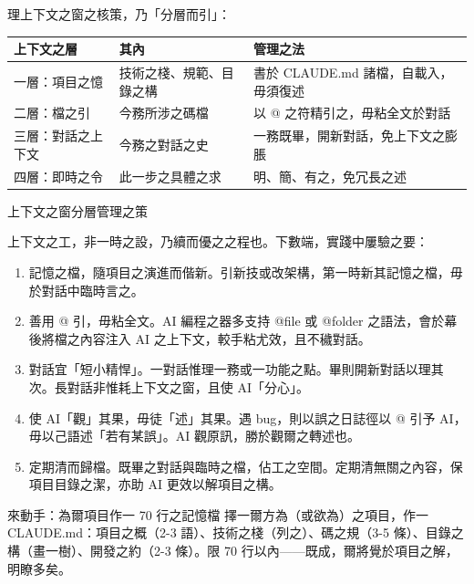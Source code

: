 理上下文之窗之核策，乃「分層而引」：

\begin{center}
\begin{tabularx}{\linewidth}{|X|X|X|}
\hline
\textbf{上下文之層} & \textbf{其內} & \textbf{管理之法} \tabularnewline
\hline
一層：項目之憶 & 技術之棧、規範、目錄之構 & 書於 CLAUDE.md 諸檔，自載入，毋須復述 \tabularnewline
二層：檔之引 & 今務所涉之碼檔 & 以 @ 之符精引之，毋粘全文於對話 \tabularnewline
三層：對話之上下文 & 今務之對話之史 & 一務既畢，開新對話，免上下文之膨脹 \tabularnewline
四層：即時之令 & 此一步之具體之求 & 明、簡、有之，免冗長之述 \tabularnewline
\hline
\end{tabularx}
\end{center}

\begin{center}\small\color{gray}上下文之窗分層管理之策\end{center}


上下文之工，非一時之設，乃續而優之之程也。下數端，實踐中屢驗之要：

\begin{enumerate}
  \item 記憶之檔，隨項目之演進而偕新。引新技或改架構，第一時新其記憶之檔，毋於對話中臨時言之。
  \item 善用 @ 引，毋粘全文。AI 編程之器多支持 @file 或 @folder 之語法，會於幕後將檔之內容注入 AI 之上下文，較手粘尤效，且不穢對話。
  \item 對話宜「短小精悍」。一對話惟理一務或一功能之點。畢則開新對話以理其次。長對話非惟耗上下文之窗，且使 AI「分心」。
  \item 使 AI「觀」其果，毋徒「述」其果。遇 bug，則以誤之日誌徑以 @ 引予 AI，毋以己語述「若有某誤」。AI 觀原訊，勝於觀爾之轉述也。
  \item 定期清而歸檔。既畢之對話與臨時之檔，佔工之空間。定期清無關之內容，保項目目錄之潔，亦助 AI 更效以解項目之構。
\end{enumerate}

\begin{tcbpractice}{來動手：為爾項目作一 70 行之記憶檔}
擇一爾方為（或欲為）之項目，作一 CLAUDE.md：項目之概（2-3 語）、技術之棧（列之）、碼之規（3-5 條）、目錄之構（畫一樹）、開發之約（2-3 條）。限 70 行以內——既成，爾將覺於項目之解，明瞭多矣。

\end{tcbpractice}

